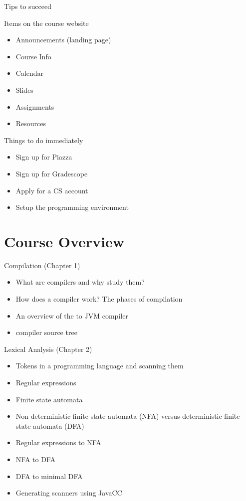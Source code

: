 \documentclass[8pt,a4paper,compress]{beamer}
\begin{document}
\begin{frame}[fragile]
\pause

Tips to succeed

\pause
\bigskip

Items on the course website
\begin{itemize}
\item Announcements (landing page)
\item Course Info
\item Calendar
\item Slides 
\item Assignments
\item Resources
\end{itemize}

\pause
\bigskip

Things to do immediately
\begin{itemize}
\item Sign up for Piazza
\item Sign up for Gradescope
\item Apply for a CS account
\item Setup the programming environment
\end{itemize}
\end{frame}

\section{Course Overview}

\begin{frame}[fragile]
\pause

Compilation (Chapter 1)
\begin{itemize}
\item What are compilers and why study them?
\item How does a compiler work? The phases of compilation
\item An overview of the \jmm to JVM compiler
\item \jmm compiler source tree
\end{itemize}

\pause
\bigskip

Lexical Analysis (Chapter 2)
\begin{itemize}
\item Tokens in a programming language and scanning them
\item Regular expressions
\item Finite state automata
\item Non-deterministic finite-state automata (NFA) versus deterministic finite-state automata (DFA)
\item Regular expressions to NFA
\item NFA to DFA
\item DFA to minimal DFA
\item Generating scanners using JavaCC
\end{itemize}
\end{frame}
\end{document}
